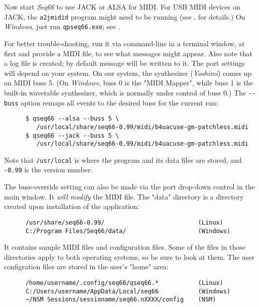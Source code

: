    Now start \textsl{Seq66} to use JACK or ALSA for MIDI.
   For USB MIDI devices on JACK, the \texttt{a2jmidid} program might
   need to be running
   (see , for details.)
   On \textsl{Windows}, just run \texttt{qpseq66.exe};
   see .

   For better trouble-shooting, run it via command-line in
   a terminal window, at first and provide a MIDI file, to
   see what messages might appear.
   Also note that a log file is created; by default message will be
   written to it.
   The port settings will depend on your system.
   On our system, the synthesizer (\textsl{Yoshimi}) comes up on MIDI buss 5.
   (On \textsl{Windows}, buss 0 is the "MIDI Mapper", while buss 1 is the
   built-in wavetable synthesizer, which is normally under control of buss 0.)
   The \texttt{-{}-buss} option remaps all events to the desired buss for
   the current run:

   \begin{verbatim}
      $ qseq66 --alsa --buss 5 \
         /usr/local/share/seq66-0.99/midi/b4uacuse-gm-patchless.midi
      $ qseq66 --jack --buss 5 \
         /usr/local/share/seq66-0.99/midi/b4uacuse-gm-patchless.midi
   \end{verbatim}

   Note that \texttt{/usr/local} is where the program and its data files
   are stored, and \texttt{-0.99} is the version number.

   The buss-override setting can also be made via the port drop-down control
   in the main window.
   It \textsl{will modify} the MIDI file.
   The "data" directory is a directory created upon installation of the
   application:

   \begin{verbatim}
      /usr/share/seq66-0.99/                          (Linux)
      C:/Program Files/Seq66/data/                    (Windows)
   \end{verbatim}

   It contains sample MIDI files and configuration files.
   Some of the files in those directories apply to both operating systems, so
   be sure to look at them.
   The user configration files are stored in the user's "home" area:

   \begin{verbatim}
      /home/username/.config/seq66/qseq66.*           (Linux)
      C:/Users/username/AppData/Local/seq66           (Windows)
      ~/NSM Sessions/sessioname/seq66.nXXXX/config    (NSM)
   \end{verbatim}

